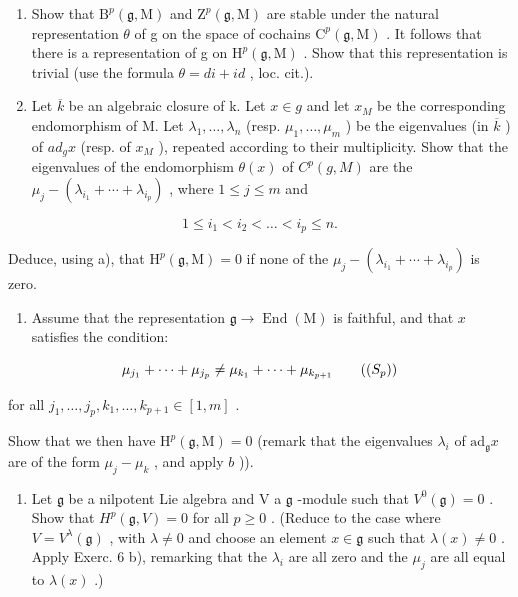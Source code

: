 \begin{enumerate}
\def\labelenumi{\alph{enumi})}
\item
  Show that \(\mathrm{B}^{p}(\mathfrak{g},\mathrm{M})\) and \(\mathrm{Z}^{p}(\mathfrak{g},\mathrm{M})\) are stable under the natural representation \(\theta\) of g on the space of cochains \(\mathrm{C}^{p}(\mathfrak{g},\mathrm{M})\) . It follows that there is a representation of g on \(\mathrm{H}^{p}(\mathfrak{g},\mathrm{M})\) . Show that this representation is trivial (use the formula \(\theta = di + id\) , loc. cit.).
\item
  Let \(\overline{k}\) be an algebraic closure of k. Let \(x \in g\) and let \(x_{M}\) be the corresponding endomorphism of M. Let \(\lambda_{1}, \ldots, \lambda_{n}\) (resp. \(\mu_{1}, \ldots, \mu_{m}\) ) be the eigenvalues (in \(\overline{k}\) ) of \(ad_{g}x\) (resp. of \(x_{M}\) ), repeated according to their multiplicity. Show that the eigenvalues of the endomorphism \(\theta(x)\) of \(C^{p}(g, M)\) are the \(\mu_{j} - (\lambda_{i_{1}} + \cdots + \lambda_{i_{p}})\) , where \(1 \leq j \leq m\) and
\end{enumerate}

\[
1 \leq i _ {1} <   i _ {2} <   \dots <   i _ {p} \leq n.
\]

Deduce, using a), that \(\mathrm{H}^{p}(\mathfrak{g},\mathrm{M})=0\) if none of the \(\mu_{j}-(\lambda_{i_{1}}+\cdots+\lambda_{i_{p}})\) is zero.

\begin{enumerate}
\def\labelenumi{\alph{enumi})}
\setcounter{enumi}{2}
\tightlist
\item
  Assume that the representation \(\mathfrak{g} \to \operatorname{End}(\mathrm{M})\) is faithful, and that \(x\) satisfies the condition:
\end{enumerate}

\[
\mu_ {j _ {1}} + \dots + \mu_ {j _ {p}} \neq \mu_ {k _ {1}} + \dots + \mu_ {k _ {p + 1}}\tag{($S_{p}$)}
\]

for all \(j_{1},\ldots,j_{p},k_{1},\ldots,k_{p+1}\in[1,m]\) .

Show that we then have \(\mathrm{H}^p (\mathfrak{g},\mathrm{M}) = 0\) (remark that the eigenvalues \(\lambda_{i}\) of \(\mathrm{ad}_{\mathfrak{g}}x\) are of the form \(\mu_j - \mu_k\) , and apply \(b\) )).

\begin{enumerate}
\def\labelenumi{\arabic{enumi})}
\setcounter{enumi}{6}
\tightlist
\item
  Let \(\mathfrak{g}\) be a nilpotent Lie algebra and V a \(\mathfrak{g}\) -module such that \(V^0(\mathfrak{g}) = 0\) . Show that \(H^p(\mathfrak{g}, V) = 0\) for all \(p \geq 0\) . (Reduce to the case where \(V = V^\lambda(\mathfrak{g})\) , with \(\lambda \neq 0\) and choose an element \(x \in \mathfrak{g}\) such that \(\lambda(x) \neq 0\) . Apply Exerc. 6 b), remarking that the \(\lambda_i\) are all zero and the \(\mu_j\) are all equal to \(\lambda(x)\) .)
\end{enumerate}

